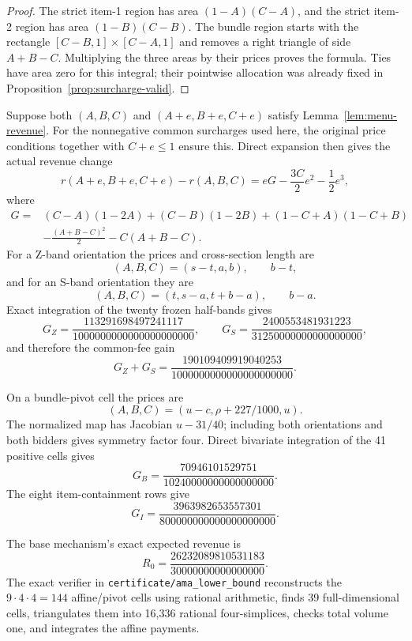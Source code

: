 \documentclass[11pt]{article}
\begin{document}
\begin{proof}
The strict item-1 region has area \((1-A)(C-A)\), and the strict item-2
region has area \((1-B)(C-B)\).  The bundle region starts with the rectangle
\([C-B,1]\times[C-A,1]\) and removes a right triangle of side
\(A+B-C\).  Multiplying the three areas by their prices proves the formula.
Ties have area zero for this integral; their pointwise allocation was already
fixed in Proposition~\ref{prop:surcharge-valid}.
\end{proof}

Suppose both \((A,B,C)\) and \((A+e,B+e,C+e)\) satisfy
Lemma~\ref{lem:menu-revenue}.  For the nonnegative common surcharges used here,
the original price conditions together with \(C+e\leq1\) ensure this.
Direct expansion then gives the actual revenue change
\begin{equation}\label{eq:delta-general}
r(A+e,B+e,C+e)-r(A,B,C)
=eG-\frac{3C}{2}e^2-\frac12e^3,
\end{equation}
where
\[
\begin{split}
G={}&(C-A)(1-2A)+(C-B)(1-2B)
 +(1-C+A)(1-C+B)\\
&-\frac{(A+B-C)^2}{2}-C(A+B-C).
\end{split}
\]
For a Z-band orientation the prices and cross-section length are
\[
(A,B,C)=(s-t,a,b),\qquad b-t,
\]
and for an S-band orientation they are
\[
(A,B,C)=(t,s-a,t+b-a),\qquad b-a.
\]
Exact integration of the twenty frozen half-bands gives
\[
G_Z=\frac{113291698497241117}{1000000000000000000000},\qquad
G_S=\frac{2400553481931223}{31250000000000000000},
\]
and therefore the common-fee gain
\[
G_Z+G_S=
\frac{190109409919040253}{1000000000000000000000}.
\]

On a bundle-pivot cell the prices are
\[
(A,B,C)=(u-c,\rho+227/1000,u).
\]
The normalized map has Jacobian \(u-31/40\); including both orientations and
both bidders gives symmetry factor four.  Direct bivariate integration of the
41 positive cells gives
\[
G_B=\frac{70946101529751}{10240000000000000000}.
\]
The eight item-containment rows give
\[
G_I=\frac{3963982653557301}{800000000000000000000}.
\]

The base mechanism's exact expected revenue is
\[
R_0=\frac{26232089810531183}{30000000000000000}.
\]
The exact verifier in \texttt{certificate/ama\_lower\_bound} reconstructs the
\(9\cdot4\cdot4=144\) affine/pivot cells using rational arithmetic, finds 39
full-dimensional cells, triangulates them into 16,336 rational four-simplices,
checks total volume one, and integrates the affine payments.
\end{document}

